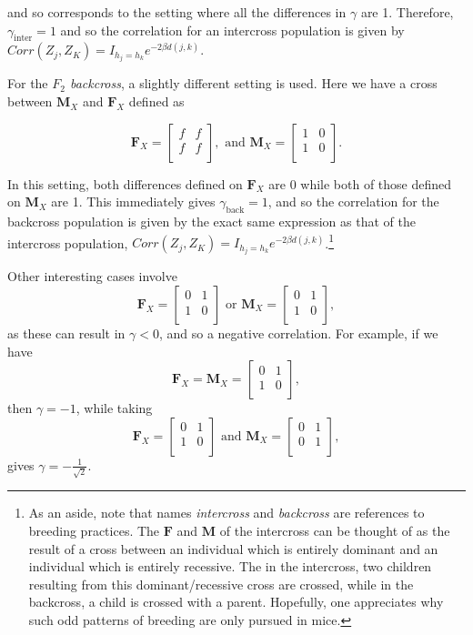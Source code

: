 \documentclass{article}
\newcommand{\m}[1]{\mathbf{#1}}               %
\begin{document}
\noindent and so corresponds to the setting where all the differences in $\gamma$ are 1. Therefore, $\gamma_{\text{inter}} = 1$ and so the correlation for an intercross population is given by $Corr(Z_j, Z_K) = I_{h_j = h_k} e^{-2 \beta d(j,k)}$.

For the \textit{$F_2$ backcross}, a slightly different setting is used. Here we have a cross between $\m{M}_X$ and $\m{F}_X$ defined as

$$\m{F}_X = \begin{bmatrix}
  f & f \\
  f & f \\
\end{bmatrix}, \text{ and }
\m{M}_X = \begin{bmatrix}
  1 & 0 \\
  1 & 0 \\
\end{bmatrix}.$$

\noindent In this setting, both differences defined on $\m{F}_X$ are 0 while both of those defined on $\m{M}_X$ are 1. This immediately gives $\gamma_{\text{back}} = 1$, and so the correlation for the backcross population is given by the exact same expression as that of the intercross population, $Corr(Z_j, Z_K) = I_{h_j = h_k} e^{-2 \beta d(j,k)}$.\footnote{As an aside, note that names \textit{intercross} and \textit{backcross} are references to breeding practices. The $\m{F}$ and $\m{M}$ of the intercross can be thought of as the result of a cross between an individual which is entirely dominant and an individual which is entirely recessive. The in the intercross, two children resulting from this dominant/recessive cross are crossed, while in the backcross, a child is crossed with a parent. Hopefully, one appreciates why such odd patterns of breeding are only pursued in mice.}

Other interesting cases involve
$$\m{F}_X = \begin{bmatrix}
  0 & 1 \\
  1 & 0 \\
\end{bmatrix} \text{ or } \m{M}_X = \begin{bmatrix}
  0 & 1 \\
  1 & 0 \\
\end{bmatrix},$$
as these can result in $\gamma < 0$, and so a negative correlation. For example, if we have
$$\m{F}_X = \m{M}_X = \begin{bmatrix}
  0 & 1 \\
  1 & 0 \\
\end{bmatrix},$$
then $\gamma = -1$, while taking
$$\m{F}_X = \begin{bmatrix}
  0 & 1 \\
  1 & 0 \\
\end{bmatrix} \text{ and } \m{M}_X = \begin{bmatrix}
  0 & 1 \\
  0 & 1 \\
\end{bmatrix},$$
gives $\gamma = -\frac{1}{\sqrt{2}}$.
\end{document}
